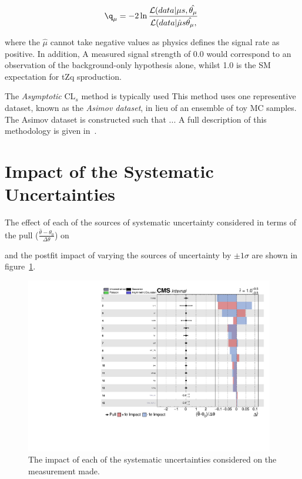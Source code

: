 \begin{equation}
\q_{\mu} =  -2 \ln \frac{ \mathcal{L}(data | \mu s , \hat{\theta_{\mu}}}{ \mathcal{L}(data | \hat{\mu} s \hat{\theta_{\mu}},  } \;
\label{eq:testStatistic}
\end{equation}

where the
$\hat{\mu}$ 
cannot take negative values as physics defines the signal rate as positive.
In addition, 
A measured signal strength of 0.0 would correspond to an observation of the background-only hypothesis alone, whilst 1.0 is the SM expectation for tZq sproduction.


The \emph{Asymptotic} CL$_{s}$ method is typically used 
This method uses one representive dataset, known as the \emph{Asimov dataset}, in lieu of an ensemble of toy MC samples.
The Asimov dataset is constructed such that ...
A full description of this methodology is given in~\cite{Cowan:2010js}.


\section{Impact of the Systematic Uncertainties}\label{sec:uncertainitiesImpact}
The effect of each of the sources of systematic uncertainty considered in terms of the pull ($\frac{ \hat{\theta} - \theta_{0} }{\Delta \theta}$) on 

and the postfit impact of varying the sources of uncertainty by $\pm 1 \sigma$ are shown in figure~\ref{fig:systematicsPull}.


\begin{figure}[htbp]
\begin{center}
\includegraphics[width=0.97\textwidth]{figs/results/systematicsImpact.pdf}
\caption{The impact of each of the systematic uncertainties considered on the measurement made.}
\label{fig:systematicsPull}
\end{center}
\end{figure}


